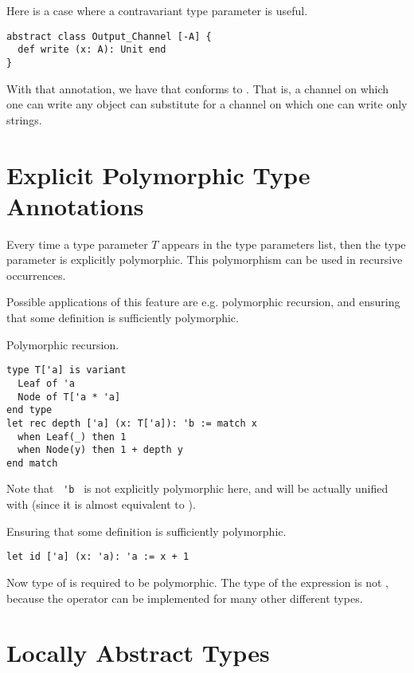 \example Here is a case where a contravariant type parameter is useful. 
\begin{lstlisting}
abstract class Output_Channel [-A] {
  def write (x: A): Unit end
}
\end{lstlisting}
With that annotation, we have that  conforms to . That is, a channel on which one can write any object can substitute for a channel on which one can write only strings. 




\section{Explicit Polymorphic Type Annotations}
\label{sec:explicit-polymorphic-type-annotations}

Every time a type parameter $T$ appears in the type parameters list, then the type parameter is explicitly polymorphic. This polymorphism can be used in recursive occurrences. 

Possible applications of this feature are e.g. polymorphic recursion, and ensuring that some definition is sufficiently polymorphic.

\example Polymorphic recursion.
\begin{lstlisting}
type T['a] is variant
  Leaf of 'a
  Node of T['a * 'a]
end type
let rec depth ['a] (x: T['a]): 'b := match x
  when Leaf(_) then 1
  when Node(y) then 1 + depth y
end match
\end{lstlisting}
Note that ~\lstinline!'b!~ is not explicitly polymorphic here, and will be actually unified with  (since it is almost equivalent to ). 

\example Ensuring that some definition is sufficiently polymorphic.
\begin{lstlisting}
let id ['a] (x: 'a): 'a := x + 1 
\end{lstlisting}
Now type of  is required to be polymorphic. The type of the expression  is not , because the operator \code{+} can be implemented for many other different types.





\section{Locally Abstract Types}
\label{sec:locally-abstract-types}

